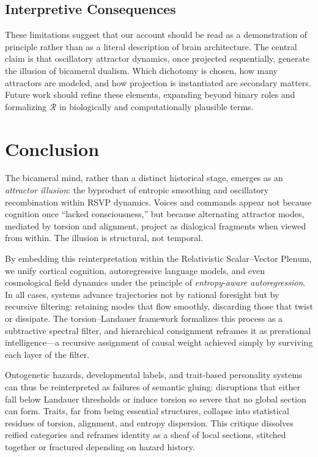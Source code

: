 \documentclass[a4paper,11pt]{article}
\begin{document}
\subsection{Interpretive Consequences}
These limitations suggest that our account should be read as a demonstration of
principle rather than as a literal description of brain architecture. The
central claim is that oscillatory attractor dynamics, once projected
sequentially, generate the illusion of bicameral dualism. Which dichotomy is
chosen, how many attractors are modeled, and how projection is instantiated are
secondary matters. Future work should refine these elements, expanding beyond
binary roles and formalizing $\mathcal{R}$ in biologically and computationally
plausible terms.

\section{Conclusion}
\label{sec:conclusion}

The bicameral mind, rather than a distinct historical stage, emerges as an
\emph{attractor illusion}: the byproduct of entropic smoothing and oscillatory
recombination within RSVP dynamics. Voices and commands appear not because
cognition once ``lacked consciousness,'' but because alternating attractor
modes, mediated by torsion and alignment, project as dialogical fragments when
viewed from within. The illusion is structural, not temporal.

By embedding this reinterpretation within the Relativistic Scalar--Vector
Plenum, we unify cortical cognition, autoregressive language models, and even
cosmological field dynamics under the principle of \emph{entropy-aware
autoregression}. In all cases, systems advance trajectories not by rational
foresight but by recursive filtering: retaining modes that flow smoothly,
discarding those that twist or dissipate. The torsion--Landauer framework
formalizes this process as a subtractive spectral filter, and hierarchical
consignment reframes it as prerational intelligence---a recursive assignment
of causal weight achieved simply by surviving each layer of the filter.

Ontogenetic hazards, developmental labels, and trait-based personality systems
can thus be reinterpreted as failures of semantic gluing: disruptions that
either fall below Landauer thresholds or induce torsion so severe that no
global section can form. Traits, far from being essential structures, collapse
into statistical residues of torsion, alignment, and entropy dispersion. This
critique dissolves reified categories and reframes identity as a sheaf of
local sections, stitched together or fractured depending on hazard history.
\end{document}

